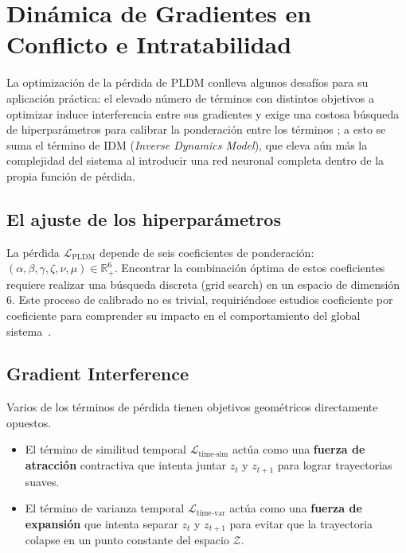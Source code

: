 \section{Dinámica de Gradientes en Conflicto e Intratabilidad}
\label{sec:inestabilidad_gradientes}

La optimización de la pérdida de PLDM conlleva algunos desafíos para su aplicación práctica: el elevado número de términos con distintos objetivos a optimizar induce interferencia entre sus gradientes \cite{yu2020gradient} y exige una costosa búsqueda de hiperparámetros para calibrar la ponderación entre los términos \cite{sobal2025planning}; a esto se suma el término de IDM (\textit{Inverse Dynamics Model}), que eleva aún más la complejidad del sistema al introducir una red neuronal completa dentro de la propia función de pérdida.

\subsection*{El ajuste de los hiperparámetros}
La pérdida $\mathcal{L}_{\text{PLDM}}$ depende de seis coeficientes de ponderación: $(\alpha, \beta, \gamma, \zeta, \nu, \mu) \in \mathbb{R}^6_+$. Encontrar la combinación óptima de estos coeficientes requiere realizar una búsqueda discreta (grid search) en un espacio de dimensión 6. Este proceso de calibrado no es trivial, requiriéndose estudios coeficiente por coeficiente para comprender su impacto en el comportamiento del global sistema~\cite{sobal2025planning}.

\subsection*{Gradient Interference}
Varios de los términos de pérdida tienen objetivos geométricos directamente opuestos.
\begin{itemize}
    \item El término de similitud temporal $\mathcal{L}_{\text{time-sim}}$ actúa como una \textbf{fuerza de atracción} contractiva que intenta juntar $z_t$ y $z_{t+1}$ para lograr trayectorias suaves.
    \item El término de varianza temporal $\mathcal{L}_{\text{time-var}}$ actúa como una \textbf{fuerza de expansión} que intenta separar $z_t$ y $z_{t+1}$ para evitar que la trayectoria colapse en un punto constante del espacio $\mathcal{Z}$.
\end{itemize}

